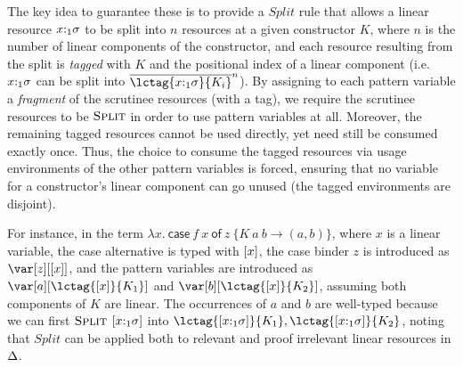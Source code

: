 \documentclass[acmsmall,review,anonymous,screen]{acmart}
\newcommand{\ccase}[2]{\mathsf{case}~#1~\mathsf{of}~#2}
\begin{document}
The key idea to guarantee these is to provide a $\textit{Split}$ rule that
allows a linear resource $x{:}_1\sigma$ to be split into $n$ resources at a given
constructor $K$, where $n$ is the number of linear components of the
constructor, and each resource resulting from the split is \emph{tagged} with
$K$ and the positional index of a linear component (i.e. $x{:}_1\sigma$ can be
split into $\ov{\lctag{x{:}_1\s}{K_i}}^n$).
%
By assigning to each pattern variable a \emph{fragment} of the scrutinee
resources (with a tag), we require the scrutinee resources to be
$\textsc{Split}$ in order to use pattern variables at all.  Moreover, the
remaining tagged resources cannot be used directly, yet need still be consumed
exactly once. Thus, the choice to consume the tagged resources via usage
environments of the other pattern variables is forced, ensuring that no
variable for a constructor's linear component can go unused (the tagged environments are disjoint).

For instance, in the term $\lambda x.~\ccase{f~x}{z~\{K~a~b\to
  (a,b)\}}$, where $x$ is a linear variable, the case alternative is
typed with $\left[x\right]$,
the case binder $z$ is introduced as $\z[\irr{x}]$, and the pattern variables
are introduced as $\var[a][\lctag{\irr{x}}{K_1}]$ and
$\var[b][\lctag{\irr{x}}{K_2}]$, assuming both components of $K$ are linear.
%
The occurrences of $a$ and $b$ are well-typed because we can first
$\textsc{Split}$ $[x{:}_1\sigma]$ into $\lctag{[x{:}_1\s]}{K_1}, \lctag{[x{:}_1\s]}{K_2}$,
%
%
noting that $Split$ can be applied both to relevant and proof irrelevant linear
resources in $\Delta$.

\end{document}
